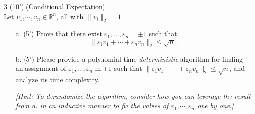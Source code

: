     
\begin{question}{3 (10') (Conditional Expectation)}~\\ 
Let $v_1, \cdots, v_n \in \mathbb R^n$, all with $\|v_i\|_2= 1$.
\begin{enumerate}
    \item [a. (5')] Prove that there exist $\varepsilon_1, \dots, \varepsilon_n =\pm 1$ such that
            $$ 
            \|\varepsilon_1 v_1 + \cdots + \varepsilon_n v_n\|_2 \leq \sqrt{n}.
            $$

    \item [b. (5')] Please provide a polynomial-time \textit{deterministic} algorithm for finding an assignment of $\varepsilon_1,\dots, \varepsilon_n$ in $\pm1$ such that $\|\varepsilon_1 v_1 + \cdots + \varepsilon_n v_n\|_2 \leq \sqrt{n}$, and analyze its time complexity. 

    \textit{[Hint: To derandomize the algorithm, consider how you can leverage the result from \textnormal{a.} in an inductive manner to fix the values of $\varepsilon_1, \cdots, \varepsilon_n$ one by one.]}
\end{enumerate}
\end{question}

